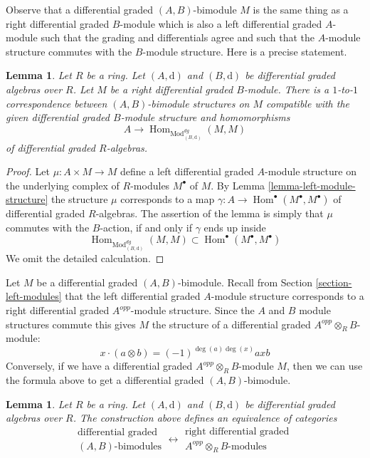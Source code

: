 \documentclass{stacks-project}
\theoremstyle{plain}
\newtheorem{lemma}[subsection]{Lemma}
\theoremstyle{definition}
\theoremstyle{remark}
\numberwithin{equation}{subsection}
\def\Hom{\mathop{\mathrm{Hom}}\nolimits}
\begin{document}
\noindent
Observe that a differential graded $(A, B)$-bimodule
$M$ is the same thing as a right differential graded
$B$-module which is also a left differential graded
$A$-module such that the grading and differentials agree
and such that the $A$-module structure commutes with
the $B$-module structure. Here is a precise statement.

\begin{lemma}
\label{lemma-what-makes-a-bimodule-dg}
Let $R$ be a ring. Let $(A, \text{d})$ and $(B, \text{d})$ be
differential graded algebras over $R$. Let $M$ be a right differential
graded $B$-module. There is a $1$-to-$1$ correspondence
between $(A, B)$-bimodule structures on $M$ compatible with the given
differential graded $B$-module structure and homomorphisms
$$
A
\longrightarrow
\Hom_{\text{Mod}^{dg}_{(B, \text{d})}}(M, M)
$$
of differential graded $R$-algebras.
\end{lemma}

\begin{proof}
Let $\mu : A \times M \to M$ define a left differential graded $A$-module
structure on the underlying complex of $R$-modules $M^\bullet$ of $M$.
By Lemma \ref{lemma-left-module-structure} the structure $\mu$ corresponds
to a map $\gamma : A \to \Hom^\bullet(M^\bullet, M^\bullet)$
of differential graded $R$-algebras. The assertion of the lemma is simply
that $\mu$ commutes with the $B$-action, if and only if $\gamma$ ends
up inside
$$
\Hom_{\text{Mod}^{dg}_{(B, \text{d})}}(M, M) \subset
\Hom^\bullet(M^\bullet, M^\bullet)
$$
We omit the detailed calculation.
\end{proof}

\noindent
Let $M$ be a differential graded $(A, B)$-bimodule. Recall from
Section \ref{section-left-modules} that the left differential graded
$A$-module structure corresponds to a right differential graded
$A^{opp}$-module structure. Since the $A$ and $B$ module structures
commute this gives $M$ the structure of a differential graded
$A^{opp} \otimes_R B$-module:
$$
x \cdot (a \otimes b) = (-1)^{\deg(a)\deg(x)} axb
$$
Conversely, if we have a differential graded $A^{opp} \otimes_R B$-module
$M$, then we can use the formula above to get a differential graded
$(A, B)$-bimodule.

\begin{lemma}
\label{lemma-bimodule-over-tensor}
Let $R$ be a ring. Let $(A, \text{d})$ and $(B, \text{d})$
be differential graded algebras over $R$. The construction above
defines an equivalence of categories
$$
\begin{matrix}
\text{differential graded}\\
(A, B)\text{-bimodules}
\end{matrix}
\longleftrightarrow
\begin{matrix}
\text{right differential graded }\\
A^{opp} \otimes_R B\text{-modules}
\end{matrix}
$$
\end{lemma}
\end{document}
